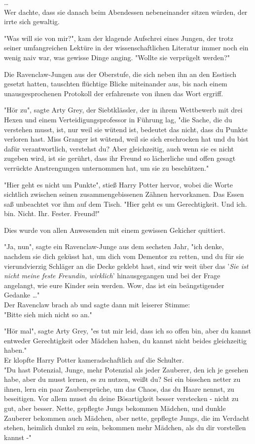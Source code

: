 {…\\ Wer dachte, dass sie danach beim Abendessen nebeneinander sitzen würden, der irrte sich gewaltig.

"Was will sie von mir?", kam der klagende Aufschrei eines Jungen, der trotz seiner umfangreichen Lektüre in der wissenschaftlichen Literatur immer noch ein wenig naiv war, was gewisse Dinge anging. "Wollte sie verprügelt werden?"

Die Ravenclaw-Jungen aus der Oberstufe, die sich neben ihn an den Esstisch gesetzt hatten, tauschten flüchtige Blicke miteinander aus, bis nach einem unausgesprochenen Protokoll der erfahrenste von ihnen das Wort ergriff.

"Hör zu", sagte Arty Grey, der Siebtklässler, der in ihrem Wettbewerb mit drei Hexen und einem Verteidigungsprofessor in Führung lag, "die Sache, die du verstehen musst, ist, nur weil sie wütend ist, bedeutet das nicht, dass du Punkte verloren hast. Miss Granger ist wütend, weil sie sich erschrocken hat und du bist dafür verantwortlich, verstehst du? Aber gleichzeitig, auch wenn sie es nicht zugeben wird, ist sie gerührt, dass ihr Freund so lächerliche und offen gesagt verrückte Anstrengungen unternommen hat, um sie zu beschützen."

"Hier geht es nicht um Punkte", stieß Harry Potter hervor, wobei die Worte sichtlich zwischen seinen zusammengebissenen Zähnen hervorkamen. Das Essen saß unbeachtet vor ihm auf dem Tisch. "Hier geht es um Gerechtigkeit. Und ich. bin. Nicht. Ihr. Fester. Freund!"

Dies wurde von allen Anwesenden mit einem gewissen Gekicher quittiert.

"Ja, nun", sagte ein Ravenclaw-Junge aus dem sechsten Jahr, "ich denke, nachdem sie dich geküsst hat, um dich vom Dementor zu retten, und du für sie vierundvierzig Schläger an die Decke geklebt hast, sind wir weit über das '\emph{Sie ist nicht meine feste Freundin, wirklich}' hinausgegangen und bei der Frage angelangt, wie eure Kinder sein werden. Wow, das ist ein beängstigender Gedanke …"\\ Der Ravenclaw brach ab und sagte dann mit leiserer Stimme:\\ "Bitte sieh mich nicht so an."

"Hör mal", sagte Arty Grey, "es tut mir leid, dass ich so offen bin, aber du kannst entweder Gerechtigkeit oder Mädchen haben, du kannst nicht beides gleichzeitig haben."\\ Er klopfte Harry Potter kameradschaftlich auf die Schulter.\\ "Du hast Potenzial, Junge, mehr Potenzial als jeder Zauberer, den ich je gesehen habe, aber du musst lernen, es zu nutzen, weißt du? Sei ein bisschen netter zu ihnen, lern ein paar Zaubersprüche, um das Chaos, das du Haare nennst, zu beseitigen. Vor allem musst du deine Bösartigkeit besser verstecken - nicht zu gut, aber besser. Nette, gepflegte Jungs bekommen Mädchen, und dunkle Zauberer bekommen auch Mädchen, aber nette, gepflegte Jungs, die im Verdacht stehen, heimlich dunkel zu sein, bekommen mehr Mädchen, als du dir vorstellen kannst -"

}

